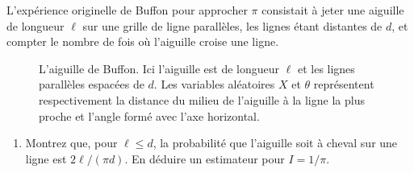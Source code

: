 \documentclass[11pt]{td_um}
\begin{document}
\begin{exo}{} %
    L'expérience originelle de Buffon pour approcher $\pi$ consistait à jeter une aiguille de longueur
    $\ell$ sur une grille de ligne parallèles, les lignes étant distantes de
    $d$, et compter le nombre de fois où l'aiguille croise une ligne.
    \begin{figure}[h!]
        \centering
        \caption{L'aiguille de Buffon. Ici l'aiguille est de longueur $\ell$
            et les lignes parallèles espacées de $d$. Les variables aléatoires
            $X$ et $\theta$ représentent respectivement la distance du milieu
            de l'aiguille à la ligne la plus proche et l'angle formé avec
        l'axe horizontal.}
        \label{fig:buffon}
    \end{figure}
    \begin{enumerate}
        \item Montrez que, pour $\ell \leq d$, la probabilité que l'aiguille soit à cheval sur une ligne est
            $2 \ell / (\pi d)$. En déduire un estimateur pour
            $I= 1 / \pi$.
\end{enumerate}
\end{exo}
\end{document}
